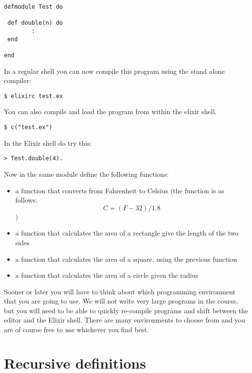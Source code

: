 \documentclass[a4paper,11pt]{article}
\begin{document}
\begin{verbatim}
defmodule Test do

 def double(n) do
        :
 end   

end
\end{verbatim}

In a regular shell you can now compile this program using the stand alone compiler:

\begin{verbatim}
$ elixirc test.ex
\end{verbatim}

You can also compile and load the program from within the elixir shell.

\begin{verbatim}
$ c("test.ex")
\end{verbatim}

In the Elixir shell do try this:

\begin{verbatim}
> Test.double(4).
\end{verbatim}

Now in the same module define the following functions:

\begin{itemize}
\item a function that converts from Fahrenheit to Celsius (the
  function is as follows:$$C = (F-32)/1.8$$)

\item a function that calculates the area of a rectangle give the
  length of the two sides

\item a function that calculates the area of a square, using the
  previous function

\item a function that calculates the area of a circle given the radius
\end{itemize} 

Sooner or later you will have to think about which programming
environment that you are going to use. We will not write very large
programs in the course, but you will need to be able to quickly
re-compile programs and shift between the editor and the Elixir
shell. There are many environments to choose from and you are of course
free to use whichever you find best.

\section{Recursive definitions}
\end{document}
